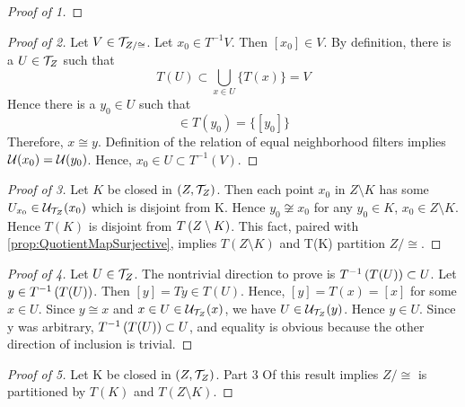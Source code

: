 \begin{prop}
\begin{proof}[Proof of 1]
    \end{proof}
    \begin{proof}[Proof of 2]
        Let $V \in \mathcal{T}_{Z/\cong}$. 
        Let $x_0 \in T^{-1}V$. 
        Then $[x_0] \in V$. 
        By definition, there is a $U \in \mathcal{T}_Z$ such that 
        \begin{equation}
            T(U) \subset \bigcup\limits_{x \in U} \{T(x)\}=V
        \end{equation}
        Hence there is a $y_0 \in U$  such that 
        \begin{equation}
            [x_0] \in T(y_0) = \{[y_0]\}
        \end{equation}
        Therefore, $x \cong y$. 
        Definition of the relation of equal neighborhood filters implies $\mathcal{U}(x_0)=\mathcal{U}(y_0)$. 
        Hence, $x_0 \in U \subset T^{-1}(V)$.
    \end{proof}
    \begin{proof}[Proof of 3]
        Let $K$ be closed in $(Z,\mathcal{T}_Z)$. 
        Then each point $x_0$ in $Z\setminus K$ has some $U_{x_0} \in \mathcal{U}_{\mathcal{T}_Z}(x_0)$ which is disjoint from K.
        Hence $y_0 \not \cong x_0$ for any $y_0 \in K$, $x_0 \in Z\setminus K$. 
        Hence $T(K)$ is disjoint from $T\left( Z \setminus K\right)$. 
        This fact, paired with \ref{prop:QuotientMapSurjective}, implies $T(Z\setminus K)$ and T(K) partition $Z/\cong$.
    \end{proof}
    \begin{proof}[Proof of 4]
        Let $U \in \mathcal{T}_Z$. 
        The nontrivial direction to prove is $T^{-1}\left( T(U)\right) \subset U$.
        Let $y \in T^{-1}\left( T(U)\right)$. 
        Then $[y]=Ty \in T(U)$.
        Hence, $[y]=T(x)=[x]$ for some $x \in U$. 
        Since $y \cong x$ and $x \in U \in \mathcal{U}_{\mathcal{T}_Z}(x)$, we have $U \in \mathcal{U}_{\mathcal{T}_Z}(y)$. 
        Hence $y \in U$.
        Since y was arbitrary, $T^{-1}\left( T(U)\right) \subset U$, and equality is obvious because the other direction of inclusion is trivial. 
    \end{proof}
    \begin{proof}[Proof of 5]
        Let K be closed in $(Z,\mathcal{T}_Z)$. Part 3 Of this result implies $Z/\cong$ is partitioned by $T(K)$ and $T(Z\setminus K)$. 
        

\end{proof}
\end{prop}
